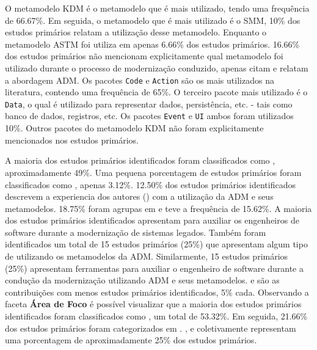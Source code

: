 O metamodelo KDM é o metamodelo que é mais utilizado, tendo uma frequência de 66.67\%. Em seguida, o metamodelo que é mais utilizado é o SMM, 10\% dos estudos primários relatam a utilização desse metamodelo. Enquanto o metamodelo ASTM foi utiliza em apenas 6.66\% dos estudos primários. 16.66\% dos estudos primários não mencionam explicitamente qual metamodelo foi utilizado durante o processo de modernização conduzido, apenas citam e relatam a abordagem ADM. Os pacotes \texttt{Code} e \texttt{Action} são os mais utilizados na literatura, contendo uma frequência de 65\%. O terceiro pacote mais utilizado é o \texttt{Data}, o qual é utilizado para representar dados, persistência, etc. - tais como banco de dados, registros, etc. Os pacotes \texttt{Event} e \texttt{UI} ambos foram utilizados 10\%. Outros pacotes do metamodelo KDM não foram explicitamente mencionados nos estudos primários.

A maioria dos estudos primários identificados foram classificados como , aproximadamente 49\%. Uma pequena porcentagem de estudos primários foram classificados como , apenas 3.12\%. 12.50\% dos estudos primários identificados descrevem a experiencia dos autores () com a utilização da ADM e seus metamodelos. 18.75\% foram agrupas em  e  teve a frequência de 15.62\%. A maioria dos estudos primários identificados apresentam  para auxiliar os engenheiros de software durante a modernização de sistemas legados. Também foram identificados um total de 15 estudos primários (25\%) que apresentam algum tipo de  utilizando os metamodelos da ADM. Similarmente, 15 estudos primários (25\%) apresentam ferramentas para auxiliar o engenheiro de software durante a condução da modernização utilizando ADM e seus metamodelos.  e  são as contribuições com menos estudos primários identificados, 5\% cada. Observando a faceta \textbf{Área de Foco} é possível visualizar que a maioria dos estudos primários identificados foram classificados como , um total de 53.32\%. Em seguida, 21.66\% dos estudos primários foram categorizados em . ,  e  coletivamente representam uma porcentagem de aproximadamente 25\% dos estudos primários.



